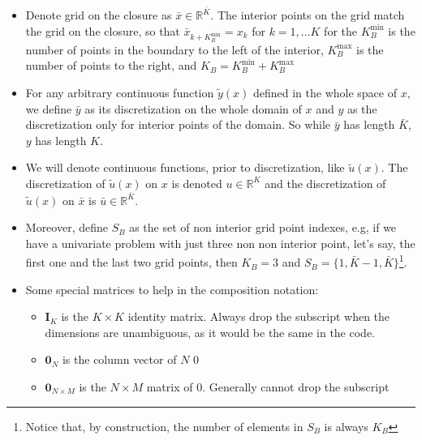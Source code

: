 \documentclass[11pt]{article}
\newcommand{\R}{\ensuremath{\mathbb{R}}}
\begin{document}
\begin{itemize}
		\item Denote grid on the closure as $\bar{x} \in \R^{\bar{K}}$.  The interior points on the grid match the grid on the closure, so that $\bar{x}_{k+K^{\min}_B} = x_{k}$ for $k = 1, \ldots K$ for the $K^{\min}_B$ is the number of points in the boundary to the left of the interior, $K^{\max}_B$ is the number of points to the right, and $K_B = K^{\min}_B + K^{\max}_B$
		\item For any arbitrary continuous function $\tilde{y}(x)$ defined in the whole space of $x$, we define $\bar{y}$ as its discretization on the whole domain of $x$ and $y$ as the discretization only for interior points of the domain. So while $\bar{y}$ has length $\bar{K}$, $y$ has length $K$.
		\item We will denote continuous functions, prior to discretization, like $\tilde{u}(x)$.  The discretization of $\tilde{u}(x)$ on $x$ is denoted $u \in \R^K$ and the discretization of $\tilde{u}(x)$ on $\bar{x}$ is $\bar{u} \in \R^{\bar{K}}$.
		\item Moreover, define $S_B$ as the set of non interior grid point indexes, e.g, if we have a univariate problem with just three non non interior point, let's say, the first one and the last two grid points, then $K_B = 3$ and $S_B = \{1,\bar{K}-1,\bar{K}\}$\footnote{Notice that, by construction, the number of elements in $S_B$ is always $K_B$}.
		\item Some special matrices to help in the composition notation:
		\begin{itemize}
			\item $\mathbf{I}_K$ is the $K\times K$ identity matrix.  Always drop the subscript when the dimensions are unambiguous, as it would be the same in the code.
			\item $\mathbf{0}_N$ is the column vector of $N$ $0$
			\item $\mathbf{0}_{N\times M}$ is the $N\times M$ matrix of $0$.  Generally cannot drop the subscript
		\end{itemize}
	\end{itemize}
\end{document}
